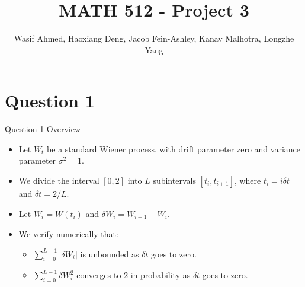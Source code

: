 \documentclass[compress,12pt]{beamer}
\title{MATH 512 - Project 3}
\subtitle{}
\date{}
\author{Wasif Ahmed, Haoxiang Deng, Jacob Fein-Ashley, Kanav Malhotra, Longzhe Yang}
\begin{document}
\frame[plain]{\titlepage}

\section{Question 1}






 


\begin{frame}{Question 1 Overview}
      \begin{itemize}
            \item Let $W_t$ be a standard Wiener process, with drift parameter zero and variance parameter $\sigma^2 = 1$.
            \item We divide the interval $[0,2]$ into $L$ subintervals $[t_i, t_{i+1}]$, where $t_i = i\delta t$ and $\delta t = 2/L$.
            \item Let $W_i = W(t_i)$ and $\delta W_i = W_{i+1} - W_i$.
            \item We verify numerically that:
            \begin{itemize}
                  \item $\sum_{i=0}^{L-1} |\delta W_i|$ is unbounded as $\delta t$ goes to zero.
                  \item $\sum_{i=0}^{L-1} \delta W_i^2$ converges to 2 in probability as $\delta t$ goes to zero.
            \end{itemize}
      \end{itemize}
      
\end{frame}
\end{document}
